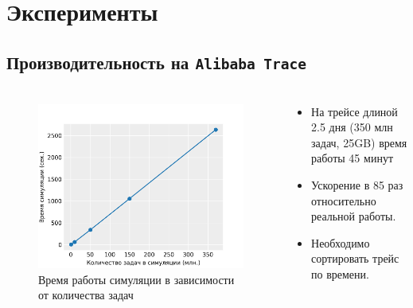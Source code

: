 \documentclass[t]{beamer}  %
\begin{document}
\section{Эксперименты}
\subsection{Производительность на \texttt{Alibaba Trace}}

\begin{frame}[fragile]
	\frametitle{\insertsection} 
	\framesubtitle{\insertsubsection}
	
	\begin{columns}[t]
		\begin{column}{0.7\linewidth}
			\vspace{-1cm}
	\begin{figure}[H]
		\centering 
		\includegraphics[width=\linewidth]{images/simulation_time}
		\caption*{Время работы симуляции в зависимости от количества задач}
	  \end{figure}
	\end{column} 
	\hspace{-1cm}
	\begin{column}{0.5\linewidth}
		\begin{itemize}
			\item На трейсе длиной 2.5 дня (350 млн задач, 25GB) время работы 45 минут
			\item Ускорение в 85 раз относительно реальной работы. 
			\item Необходимо сортировать трейс по времени.
		\end{itemize}
	\end{column}
\end{columns}
\end{frame}
\end{document}
